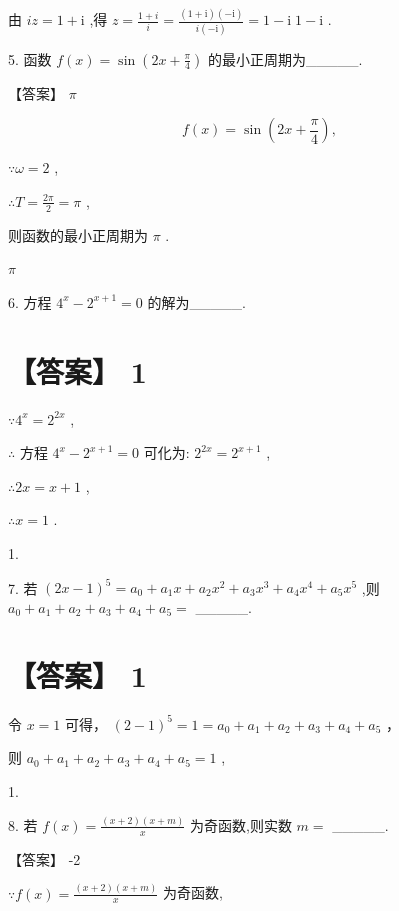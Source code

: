 \documentclass[10pt]{article}
\begin{document}
由 \({iz} = 1 + \mathrm{i}\) ,得 \(z = \frac{1 + i}{i} = \frac{\left( {1 + \mathrm{i}}\right) \left( {-\mathrm{i}}\right) }{i\left( {-\mathrm{i}}\right) } = 1 - \mathrm{i} \; 1 - \mathrm{i}\) .

5. 函数 \(f\left( x\right)  = \sin \left( {{2x} + \frac{\pi }{4}}\right)\) 的最小正周期为\_\_\_\_\_.

【答案】 \(\pi\)

\[
f\left( x\right)  = \sin \left( {{2x} + \frac{\pi }{4}}\right) ,
\]

\(\because \omega  = 2\) ,

\(\therefore T = \frac{2\pi }{2} = \pi\) ,

则函数的最小正周期为 \(\pi\) .

\(\pi\)

6. 方程 \({4}^{x} - {2}^{x + 1} = 0\) 的解为\_\_\_\_\_.

\section*{【答案】 1}

\(\because {4}^{x} = {2}^{2x}\) ,

\(\therefore\) 方程 \({4}^{x} - {2}^{x + 1} = 0\) 可化为: \({2}^{2x} = {2}^{x + 1}\) ,

\(\therefore {2x} = x + 1\) ,

\(\therefore x = 1\) .

1.

7. 若 \({\left( 2x - 1\right) }^{5} = {a}_{0} + {a}_{1}x + {a}_{2}{x}^{2} + {a}_{3}{x}^{3} + {a}_{4}{x}^{4} + {a}_{5}{x}^{5}\) ,则 \({a}_{0} + {a}_{1} + {a}_{2} + {a}_{3} + {a}_{4} + {a}_{5} =\) \_\_\_\_\_.

\section*{【答案】 1}

令 \(x = 1\) 可得， \({\left( 2 - 1\right) }^{5} = 1 = {a}_{0} + {a}_{1} + {a}_{2} + {a}_{3} + {a}_{4} + {a}_{5}\) ，

则 \({a}_{0} + {a}_{1} + {a}_{2} + {a}_{3} + {a}_{4} + {a}_{5} = 1\) ,

1.

8. 若 \(f\left( x\right)  = \frac{\left( {x + 2}\right) \left( {x + m}\right) }{x}\) 为奇函数,则实数 \(m =\) \_\_\_\_\_.

【答案】 -2

\(\because f\left( x\right)  = \frac{\left( {x + 2}\right) \left( {x + m}\right) }{x}\) 为奇函数,
\end{document}
